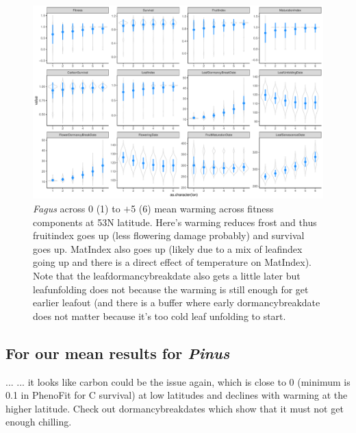 \documentclass[11pt,letter]{article}
\begin{document}
\begin{figure} 
 \begin{center}
\noindent \includegraphics[width=1\textwidth]{..//analyses/graphs/phenofit/sims/meansim53_allmetricsFS.pdf}
  \caption{\emph{Fagus} across 0 (1) to $+$5 (6) mean warming across fitness components at 53\degree N latitude. Here's warming reduces frost and thus fruitindex goes up (less flowering damage probably) and survival goes up. MatIndex also goes up (likely due to a mix of leafindex going up and there is a direct effect of temperature on MatIndex). Note that the leafdormancybreakdate also gets a little later but leafunfolding does not because the warming is still enough for get earlier leafout (and there is a buffer where early dormancybreakdate does not matter because it's too cold leaf unfolding to start. }
  \label{fig:fagusmean53}
  \end{center}
\end{figure}

\clearpage
\subsection{For our mean results for  \emph{Pinus}}...
... it looks like carbon could be the issue again, which is close to 0 (minimum is 0.1 in PhenoFit for C survival) at low latitudes and declines with warming at the higher latitude. Check out dormancybreakdates which show that it must not get enough chilling. 
\end{document}

